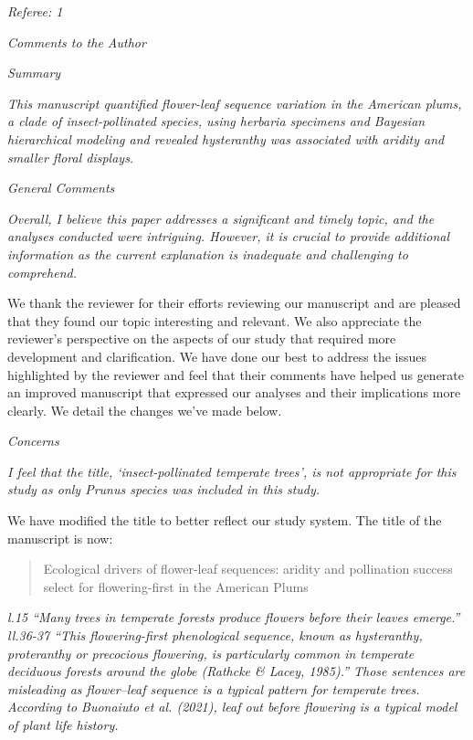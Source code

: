 \documentclass{article}[12pt]
\begin{document}


\emph{Referee: 1}

\emph{Comments to the Author}

\emph{Summary}

\emph{This manuscript quantified flower-leaf sequence variation in the American plums, a clade of insect-pollinated species, using herbaria specimens and Bayesian hierarchical modeling and revealed hysteranthy was associated with aridity and smaller floral displays.}

\emph{General Comments}

\emph{Overall, I believe this paper addresses a significant and timely topic, and the analyses conducted were intriguing. However, it is crucial to provide additional information as the current explanation is inadequate and challenging to comprehend.}


We thank the reviewer for their efforts reviewing our manuscript and are pleased that they found our topic interesting and relevant. We also appreciate the reviewer's perspective on the aspects of our study that required more development and clarification. We have done our best to address the issues highlighted by the reviewer and feel that their comments have helped us generate an improved manuscript that expressed our analyses and their implications more clearly. We detail the changes we've made below.

\emph{Concerns}

\emph{I feel that the title, ‘insect-pollinated temperate trees’, is not appropriate for this study as only Prunus species was included in this study.}

We have modified the title to better reflect our study system. The title of the manuscript is now: 
\begin{quote}Ecological drivers of flower-leaf sequences: aridity and pollination success select for flowering-first in the American Plums \end{quote}

\emph{l.15 “Many trees in temperate forests produce flowers before their leaves emerge.”
ll.36-37 “This flowering-first phenological sequence, known as hysteranthy, proteranthy or precocious flowering, is particularly common in temperate deciduous forests around the globe (Rathcke & Lacey, 1985).”
Those sentences are misleading as flower–leaf sequence is a typical pattern for temperate trees. According to Buonaiuto et al. (2021), leaf out before flowering is a typical model of plant life history.}
\end{document}
